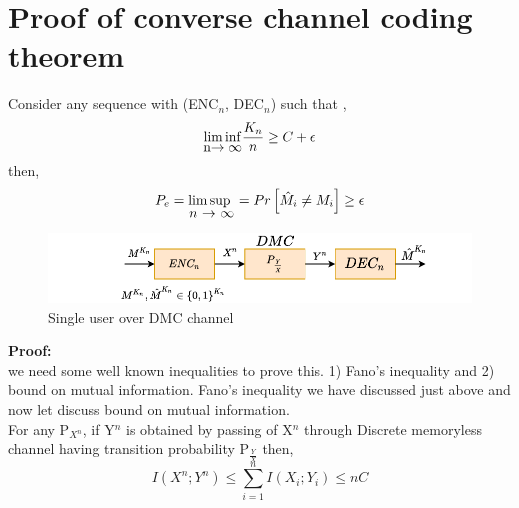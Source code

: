 \documentclass{article}
\begin{document}
 \section{Proof of converse channel coding theorem}

Consider any sequence with (ENC$_{n}$, DEC$_{n}$) such that ,\\
\begin{eqnarray*}
 \stackunder{$\liminf$}{n$\rightarrow \infty$} \frac{K_n}{n} \geq C + \epsilon
 \end{eqnarray*}
 then, 
 \begin{eqnarray*}
 	 P_{e} = \stackunder{$\limsup$ }{$n$ $\rightarrow$ $\infty$} =  Pr \left [ \hat{M}_{i} \neq M_{i} \right ] \geq \epsilon
 \end{eqnarray*} 
 \begin{figure}[h!]
  \centering
 \includegraphics[height=.10\textheight]{pic6.pdf}
 \caption{ Single user over DMC channel }
 \label{fig11.1}
 \end{figure}
 
\textbf{Proof:} \\ we need some well known inequalities to prove this. 1) Fano's inequality and 2) bound on mutual information. Fano's inequality we have discussed just above and now let discuss bound on mutual information.\\
For any P$_{X^n}$, if Y$^{n}$ is obtained by passing of X$^{n}$ through Discrete memoryless channel having transition probability P$_{\frac{Y}{X}}$  then,
\begin{equation}
	I \left( X^n ; Y^n\right) \leq \sum_{i=1}^{n} I \left( {X_i ; Y_i} \right) \leq nC \label{11.12}
\end{equation}
 
\end{document}
